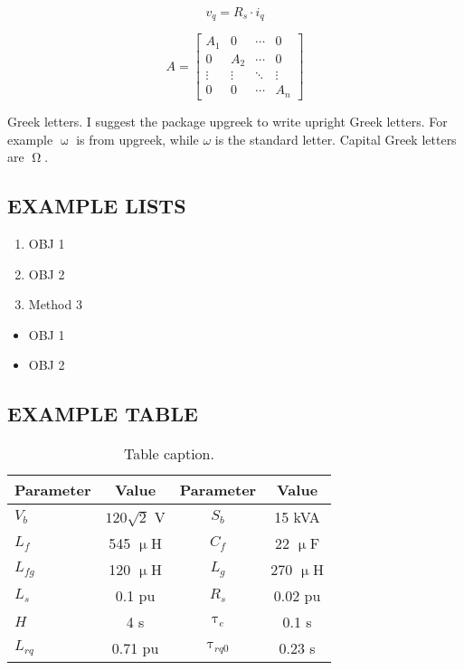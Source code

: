 \begin{equation}
v_{q}=R_s\cdot i_q
\label {Equ:2}
\end{equation}


\begin{equation}
A = 
		\begin{bmatrix}
			A_{1} & 0 & \dotsi & 0\\
			0 & A_{2} & \dotsi & 0\\
			\vdots & \vdots & \ddots & \vdots\\
			0 & 0 & \dotsi & A_{n}
		\end{bmatrix}
\end{equation}

\par Greek letters. I suggest the package upgreek to write upright Greek letters. For example $\upomega$ is from upgreek, while $\omega$ is the standard letter. Capital Greek letters are $\upOmega$.


\subsection{EXAMPLE LISTS}
\begin{enumerate}
	\item OBJ 1
	\item OBJ 2
	\item Method 3
\end{enumerate}

\begin{itemize}
	\item OBJ 1
	\item OBJ 2
\end{itemize}

\subsection{EXAMPLE TABLE}
\begin{table}[!h]
	\captionsetup{justification=justified}
	\caption{Table caption.}
	\label{tab:ExTab}
	\centering
		\begin{tabular}{@{}lccc@{}} \toprule
		\textbf{Parameter} & \textbf{Value} & \textbf{Parameter} & \textbf{Value} \\ \midrule
		$V_b$	& $120 \sqrt{2}$ V& $S_b$	& 15 kVA\\
		$L_f$   & 545 $\upmu$H & $C_f$ & 22 $\upmu$F\\
		$L_{fg}$& 120 $\upmu$H & $L_g$ & 270 $\upmu$H\\ 
		$L_{s}$& 0.1 pu & $R_s$ & 0.02 pu\\
		$H$& 4 s & $\uptau_e$ & 0.1 s\\
		$L_{rq}$& 0.71 pu & $\uptau_{rq0}$ & 0.23 s\\
		\bottomrule
		\end{tabular}
	\vspace{-10pt}
\end{table}

